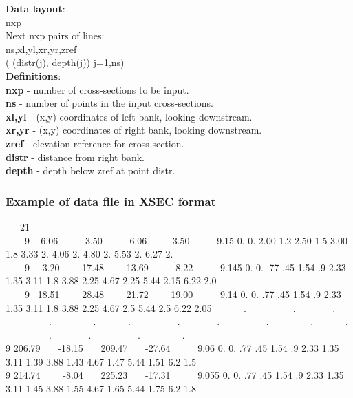 \documentclass{article}
\begin{document}
\textbf{Data layout}: \\ 

\noindent
nxp\\
Next nxp pairs of lines:\\
ns,xl,yl,xr,yr,zref\\
( (distr(j), depth(j)) j=1,ns)\\


\noindent\textbf{Definitions}:\\ 

\noindent
\textbf{nxp} - number of cross-sections to be input.\\
\textbf{ns}   - number of points in the input cross-sections.\\
\textbf{xl,yl} - (x,y) coordinates of left bank, looking downstream.\\
\textbf{xr,yr} - (x,y) coordinates of right bank, looking downstream.\\
\textbf{zref} - elevation reference for cross-section.\\
\textbf{distr} - distance from right bank.\\
\textbf{depth} - depth below zref at point distr.\\

\subsubsection[Example of data file in XSEC format]{Example of data file in XSEC format}

\ \ \ 21\\ \ \ \ \ 9 \ {}-6.06 \ \ \ \ \ 3.50 \ \ \ \ \ 6.06 \ \ \ \ {}-3.50 \ \ \ \ \ 9.15 0. 0. 2.00 1.2 2.50 1.5 3.00 1.8 3.33 2. 4.06 2. 4.80 2. 5.53 2. 6.27 2.\\ \ \ \ \ 9 \ \ 3.20 \ \ \ \ 17.48 \ \ \ \ 13.69 \ \ \ \ \ 8.22 \ \ \ \ \ 9.145 0. 0. .77 .45 1.54 .9 2.33 1.35 3.11 1.8 3.88 2.25 4.67 2.25 5.44 2.15 6.22 2.0\\ \ \ \ \ 9 \ 18.51 \ \ \ \ 28.48 \ \ \ \ 21.72 \ \ \ \ 19.00 \ \ \ \ \ 9.14 0. 0. .77 .45 1.54 .9 2.33 1.35 3.11 1.8 3.88 2.25 4.67 2.5 5.44 2.5 6.22 2.05 \ \ \ \ \ \ . \ \ \ \ \ \ \ \ \ . \ \ \ \ \ \ \ . \ \ \ \ \ \ \ \ \ . \ \ \ \ \ \ \ \ . \ \ \ \ \ \ . \ \ \ \ \ \ \ \ \ . \ \ \ \ \ \ \ . \ \ \ \ \ \ \ \ \ . \ \ \ \ \ \ \ \ . \ \ \ \ \ \ . \ \ \ \ \ \ \ \ \ . \ \ \ \ \ \ \ . \ \ \ \ \ \ \ \ \ . \ \ \ \ \ \ \ \ . \ \ \ \ \\9 206.79 \ \ \ {}-18.15 \ \ \ 209.47 \ \ \ {}-27.64 \ \ \ \ \ 9.06 0. 0. .77 .45 1.54 .9 2.33 1.35 3.11 1.39 3.88 1.43 4.67 1.47 5.44 1.51 6.2 1.5 \\ 9 214.74 \ \ \ \ {}-8.04 \ \ \ 225.23 \ \ \ {}-17.31 \ \ \ \ \ 9.055 0. 0. .77 .45 1.54 .9 2.33 1.35 3.11 1.45 3.88 1.55 
4.67 1.65 5.44 1.75 6.2 1.8
\end{document}
